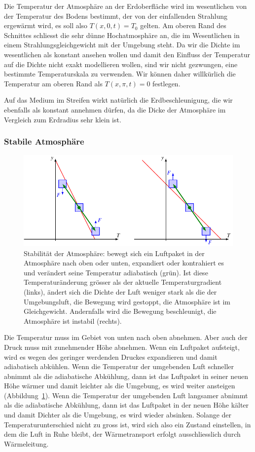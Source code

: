 Die Temperatur der Atmosphäre an der Erdoberfläche wird im wesentlichen von
der Temperatur des Bodens bestimmt, der von der einfallenden Strahlung
ergewärmt wird, es soll also $T(x,0,t)=T_0$ gelten.
Am oberen Rand des Schnittes schliesst die sehr dünne Hochatmosphäre an,
die im Wesentlichen in einem Strahlungsgleichgewicht mit der Umgebung steht.
Da wir die Dichte im wesentlichen als konstant ansehen wollen und damit
den Einfluss der Temperatur auf die Dichte nicht exakt modellieren wollen,
sind wir nicht gezwungen, eine bestimmte Temperaturskala zu verwenden.
Wir können daher willkürlich die Temperatur am oberen Rand als
$T(x,\pi,t)=0$ festlegen.

Auf das Medium im Streifen wirkt natürlich die Erdbeschleunigung,
die wir ebenfalls als konstant annehmen dürfen, da die Dicke der 
Atmosphäre im Vergleich zum Erdradius sehr klein ist.

\subsubsection{Stabile Atmosphäre}
\begin{figure}
\centering
\includegraphics{chapters/2/lorenz-stabil.pdf}
\caption{Stabilität der Atmosphäre: bewegt sich ein Luftpaket in der
Atmosphäre nach oben oder unten, expandiert oder kontrahiert es und
verändert seine Temperatur adiabatisch (grün).
Ist diese Temperaturänderung grösser als der aktuelle Temperaturgradient
(links),
ändert sich die Dichte der Luft weniger stark als die der Umgebungsluft,
die Bewegung wird gestoppt, die Atmosphäre ist im Gleichgewicht.
Andernfalls wird die Bewegung beschleunigt, die Atmosphäre ist instabil
(rechts).
\label{skript:stabilitaet der atmosphaere}}
\end{figure}
Die Temperatur muss im Gebiet von unten nach oben abnehmen.
Aber auch der Druck muss mit zunehmender Höhe abnehmen. 
Wenn ein Luftpaket aufsteigt, wird es wegen des geringer werdenden
Druckes expandieren und damit adiabatisch abkühlen.
Wenn die Temperatur der umgebenden Luft schneller abnimmt als die
adiabatische Abkühlung, dann ist das Luftpaket in seiner neuen Höhe
wärmer und damit leichter als die Umgebung, es wird weiter ansteigen
(Abbildung~\ref{skript:stabilitaet der atmosphaere}).
Wenn die Temperatur der umgebenden Luft langsamer abnimmt als die
adiabatische Abkühlung, dann ist das Luftpaket in der neuen Höhe 
kälter und damit Dichter als die Umgebung, es wird wieder absinken.
Solange der Temperaturunterschied nicht zu gross ist, wird sich also ein
Zustand einstellen, in dem die Luft in Ruhe bleibt, der Wärmetransport
erfolgt ausschliesslich durch Wärmeleitung.

